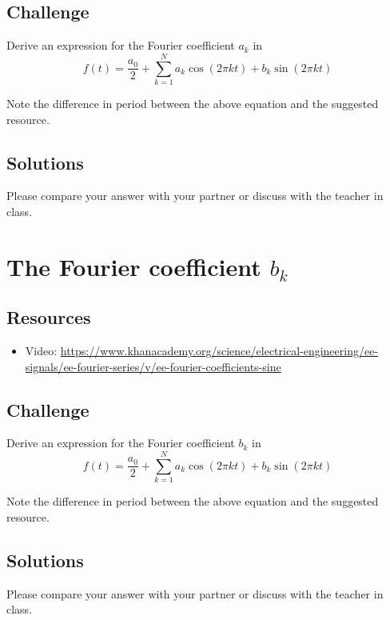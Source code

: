 \subsection*{Challenge}
Derive an expression for the Fourier coefficient $a_k$ in
\begin{equation}
    f(t) = \frac{a_0}{2} + \sum_{k=1}^{N} a_k \cos(2 \pi k t) + b_k \sin(2 \pi k t)
\end{equation}

Note the difference in period between the above equation and the suggested resource.

\subsection*{Solutions}
Please compare your answer with your partner or discuss with the teacher in class.




\newpage
\section{The Fourier coefficient $b_k$}

\subsection*{Resources}
\begin{itemize}
    \item Video: \url{https://www.khanacademy.org/science/electrical-engineering/ee-signals/ee-fourier-series/v/ee-fourier-coefficients-sine}
\end{itemize}

\subsection*{Challenge}
Derive an expression for the Fourier coefficient $b_k$ in
\begin{equation}
    f(t) = \frac{a_0}{2} + \sum_{k=1}^{N} a_k \cos(2 \pi k t) + b_k \sin(2 \pi k t)
\end{equation}

Note the difference in period between the above equation and the suggested resource.

\subsection*{Solutions}
Please compare your answer with your partner or discuss with the teacher in class.




